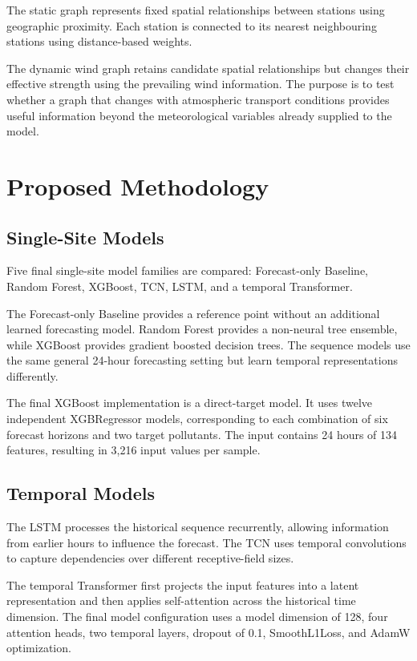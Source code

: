 \documentclass[conference]{IEEEtran}
\begin{document}
The static graph represents fixed spatial relationships between stations using geographic
proximity. Each station is connected to its nearest neighbouring stations using
distance-based weights.

The dynamic wind graph retains candidate spatial relationships but changes their effective
strength using the prevailing wind information. The purpose is to test whether a graph that
changes with atmospheric transport conditions provides useful information beyond the
meteorological variables already supplied to the model.

\section{Proposed Methodology}

\subsection{Single-Site Models}

Five final single-site model families are compared: Forecast-only Baseline, Random Forest,
XGBoost, TCN, LSTM, and a temporal Transformer.

The Forecast-only Baseline provides a reference point without an additional learned forecasting
model. Random Forest provides a non-neural tree ensemble, while XGBoost provides gradient
boosted decision trees. The sequence models use the same general 24-hour forecasting setting
but learn temporal representations differently.

The final XGBoost implementation is a direct-target model. It uses twelve independent
XGBRegressor models, corresponding to each combination of six forecast horizons and two target
pollutants. The input contains 24 hours of 134 features, resulting in 3,216 input values per
sample.

\subsection{Temporal Models}

The LSTM processes the historical sequence recurrently, allowing information from earlier
hours to influence the forecast. The TCN uses temporal convolutions to capture dependencies
over different receptive-field sizes.

The temporal Transformer first projects the input features into a latent representation and
then applies self-attention across the historical time dimension. The final model configuration
uses a model dimension of 128, four attention heads, two temporal layers, dropout of 0.1,
SmoothL1Loss, and AdamW optimization.
\end{document}
